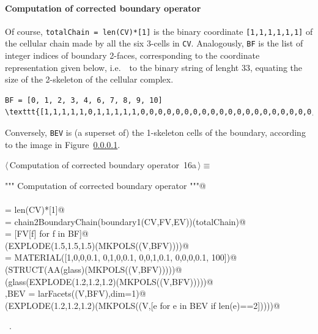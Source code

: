 \documentclass[11pt,oneside]{article}    %
\begin{document}
\paragraph{Computation of corrected boundary operator}
Of course, \texttt{totalChain = len(CV)*[1]} is the binary coordinate \texttt{[1,1,1,1,1,1]}
of the cellular chain made by all the six 3-cells in \texttt{CV}.
Analogously, \texttt{BF} is the list of integer indices of boundary 2-faces, corresponding to the coordinate representation given below, i.e.~~to the binary string of lenght 33, equating the size of the 2-skeleton of the cellular complex.
\begin{verbatim}
BF = [0, 1, 2, 3, 4, 6, 7, 8, 9, 10]
\texttt{[1,1,1,1,1,0,1,1,1,1,1,0,0,0,0,0,0,0,0,0,0,0,0,0,0,0,0,0,0,0,0,0,0]}
\end{verbatim}
Conversely, \texttt{BEV} is (a superset of) the 1-skeleton cells of the boundary, according to the image in Figure~\ref{}.

\begin{flushleft} \small \label{scrap25}
\protect{}$\langle\,$Computation of corrected boundary operator\nobreak\ {\footnotesize 16a}$\,\rangle\equiv$
\vspace{-1ex}
\begin{list}{}{} \item
\mbox{}\verb@""" Computation of corrected boundary operator """@\\
\mbox{}\verb@@\\
\mbox{}\verb@totalChain = len(CV)*[1]@\\
\mbox{}\verb@BF = chain2BoundaryChain(boundary1(CV,FV,EV))(totalChain)@\\
\mbox{}\verb@BFV = [FV[f] for f in BF]@\\
\mbox{}\verb@VIEW(EXPLODE(1.5,1.5,1.5)(MKPOLS((V,BFV))))@\\
\mbox{}\verb@glass = MATERIAL([1,0,0,0.1,  0,1,0,0.1,  0,0,1,0.1, 0,0,0,0.1, 100])@\\
\mbox{}\verb@VIEW(STRUCT(AA(glass)(MKPOLS((V,BFV)))))@\\
\mbox{}\verb@VIEW(glass(EXPLODE(1.2,1.2,1.2)(MKPOLS((V,BFV)))))@\\
\mbox{}\verb@V,BEV = larFacets((V,BFV),dim=1)@\\
\mbox{}\verb@VIEW(EXPLODE(1.2,1.2,1.2)(MKPOLS((V,[e for e in BEV if len(e)==2]))))@\\
\mbox{}\verb@@{\NWsep}
\end{list}
\vspace{-1ex}
\footnotesize\addtolength{\baselineskip}{-1ex}
\begin{list}{}{\setlength{\itemsep}{-\parsep}\setlength{\itemindent}{-\leftmargin}}
\item \NWtxtMacroRefIn\ .
\end{list}
\end{flushleft}
\end{document}
